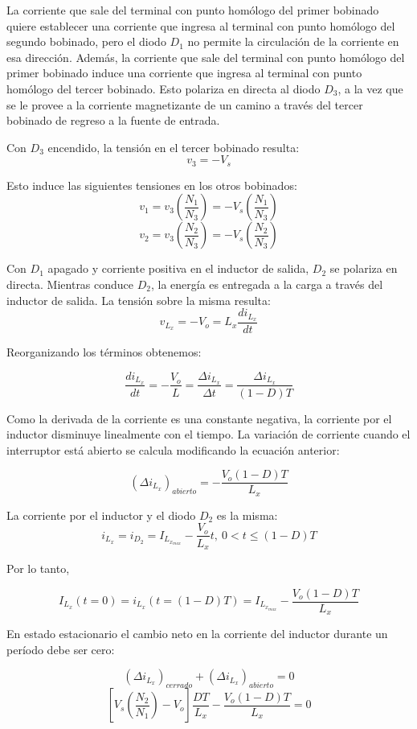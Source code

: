 La corriente que sale del terminal con punto homólogo del primer bobinado quiere establecer una corriente que ingresa al terminal 
con punto homólogo del segundo bobinado, pero el diodo $D_1$ no permite la circulación de la corriente en esa dirección. 
Además, la corriente que sale del terminal con punto homólogo del primer bobinado induce una corriente que ingresa al terminal 
con punto homólogo del tercer bobinado. Esto polariza en directa al diodo $D_3$, a la vez que 
se le provee a la corriente magnetizante de un camino a través del tercer bobinado de regreso a la fuente de entrada. 

Con $D_3$ encendido, la tensión en el tercer bobinado resulta:
$$ v_3=-V_s $$

Esto induce las siguientes tensiones en los otros bobinados:
$$ v_1=v_3\left(\frac{N_1}{N_3}\right)=-V_s\left(\frac{N_1}{N_3}\right) $$
$$ v_2=v_3\left(\frac{N_2}{N_3}\right)=-V_s\left(\frac{N_2}{N_3}\right) $$

Con $D_1$ apagado y corriente positiva en el inductor de salida, $D_2$ se polariza en directa. 
Mientras conduce $D_2$, la energía es entregada a la carga a través del inductor de salida. 
La tensión sobre la misma resulta:
$$ v_{L_x}=-V_o=L_x\frac{di_{L_x}}{dt} $$

Reorganizando los términos obtenemos:

$$ \frac{di_{L_x}}{dt}=-\frac{V_o}{L}=\frac{\Delta i_{L_x}}{\Delta t}=\frac{\Delta i_{L_x}}{(1-D)T}  $$

Como la derivada de la corriente es una constante negativa, la corriente por el inductor disminuye linealmente con el tiempo. 
La variación de corriente cuando el interruptor está abierto se calcula modificando la ecuación anterior:

$$ (\Delta i_{L_x})_{abierto}=-\frac{V_o(1-D)T}{L_x} $$

La corriente por el inductor y el diodo $D_2$ es la misma:
$$ i_{L_x}=i_{D_2}=I_{L_{x_{max}}}-\frac{V_o}{L_x}t,\ 0<t\leq (1-D)T $$

Por lo tanto,

$$ I_{L_x}(t=0)=i_{L_x}(t=(1-D)T)=I_{L_{x_{max}}}-\frac{V_o(1-D)T}{L_x} $$

En estado estacionario el cambio neto en la corriente del inductor durante un período debe ser cero:

$$ (\Delta i_{L_x})_{cerrado}+(\Delta i_{L_x})_{abierto}=0 $$
$$ \left[V_s\left(\frac{N_2}{N_1}\right)-V_o\right]\frac{DT}{L_x}-\frac{V_o(1-D)T}{L_x}=0 $$

